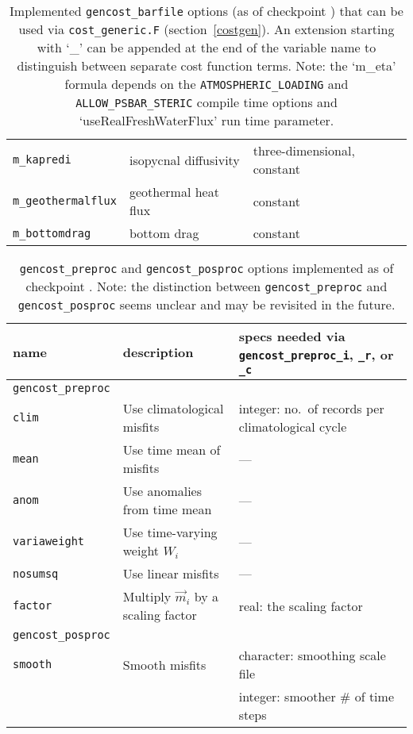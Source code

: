 \begin{table}[!ht]
\begin{tabular}{lll}
\texttt{m\_kapredi}			&	isopycnal diffusivity			& three-dimensional, constant \\ 
\texttt{m\_geothermalflux}		&	geothermal heat flux			& constant \\ 
\texttt{m\_bottomdrag}		&	bottom drag				& constant \\
\end{tabular}
\caption{Implemented \texttt{gencost\_barfile} options (as of checkpoint \mitgcmCheckpointVersion) that can be used via \texttt{cost\_generic.F} (section~\ref{costgen}). An extension starting with `\_' can be appended at the end of the variable name to distinguish between separate cost function terms. Note: the `m\_eta' formula depends on the \texttt{ATMOSPHERIC\_LOADING} and \texttt{ALLOW\_PSBAR\_STERIC} compile time options and `useRealFreshWaterFlux' run time parameter.}
\label{tbl:gencost_ecco_barfile}
\end{table}

\begin{table}[!ht]
\centering
\begin{tabular}{lll}
name					&	description					&	specs needed via \texttt{gencost\_preproc\_i}, \texttt{\_r}, or \texttt{\_c} \\ \hline\hline
\texttt{gencost\_preproc} \\ \hline
\texttt{clim} 				&	Use climatological misfits	&	integer: no.\ of records per climatological cycle \\
\texttt{mean} 				&	Use time mean of misfits 	&	--- \\
\texttt{anom} 				&	Use anomalies from time mean &	--- \\
\texttt{variaweight}			&	Use time-varying weight $W_i$&	--- \\
\texttt{nosumsq} 			&	Use linear misfits 			&	--- \\
\texttt{factor} 				&	Multiply $\vec{m}_i$ by a scaling factor	&	real: the scaling factor \\ \hline \hline
\texttt{gencost\_posproc} \\ \hline
\texttt{smooth} 				&	Smooth misfits				&	character: smoothing scale file\\ 
						&							&	integer: smoother \# of time steps \\
\end{tabular} 
\caption{\texttt{gencost\_preproc} and \texttt{gencost\_posproc} options implemented as of checkpoint \mitgcmCheckpointVersion. Note: the distinction between \texttt{gencost\_preproc} and \texttt{gencost\_posproc} seems unclear and may be revisited in the future.}
\label{tbl:gencost_ecco_preproc}
\end{table}

